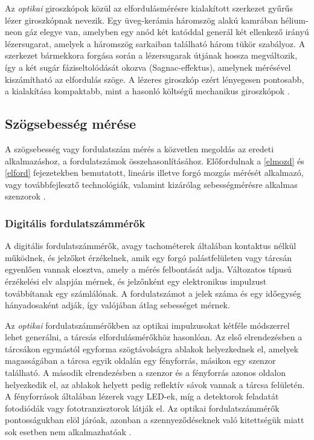 Az \textit{optikai} giroszkópok közül az elfordulásmérésre kialakított szerkezet gyűrűs lézer giroszkópnak nevezik. Egy üveg-kerámia háromszög alakú kamrában hélium-neon gáz elegye van, amelyben egy anód két katóddal generál két ellenkező irányú lézersugarat, amelyek a háromszög sarkaiban található három tükör szabályoz. A szerkezet bármekkora forgása során a lézersugarak útjának hossza megváltozik, így a két sugár fáziseltolódását okozva (Sagnac-effektus), amelynek mérésével kiszámítható az elfordulás szöge. A lézeres giroszkóp ezért lényegesen pontosabb, a kialakítása kompaktabb, mint a hasonló költségű mechanikus giroszkópok \cite{Morris2016b}.

\subsection{Szögsebesség mérése}

A szögsebesség vagy fordulatszám mérés a közvetlen megoldás az eredeti alkalmazáshoz, a fordulatszámok összehasonlításához. Előfordulnak a \ref{elmozd} és \ref{elford} fejezetekben bemutatott, lineáris illetve forgó mozgás mérését alkalmazó, vagy továbbfejlesztő technológiák, valamint kizárólag sebességmérésre alkalmas szenzorok \cite{Morris2016b}.

\subsubsection{Digitális fordulatszámmérők}

A digitális fordulatszámmérők, avagy tachométerek általában kontaktus nélkül működnek, és jelzőket érzékelnek, amik egy forgó palástfelületen vagy tárcsán egyenlően vannak elosztva, amely a mérés felbontását adja. Változatos típusú érzékelési elv alapján mérnek, és jelzőnként egy elektronikus impulzust továbbítanak egy számlálónak. A fordulatszámot a jelek száma és egy időegység hányadosaként adják, így valójában átlag sebességet mérnek. 

Az \textit{optikai} fordulatszámmérőkben az optikai impulzusokat kétféle módszerrel lehet generálni, a tárcsás elfordulásmérőkhöz hasonlóan. Az első elrendezésben a tárcsákon egymástól egyforma szögtávolságra ablakok helyezkednek el, amelyek magasságában a tárcsa egyik oldalán egy fényforrás, másikon egy szenzor található. A második elrendezésben a szenzor és a fényforrás azonos oldalon helyezkedik el, az ablakok helyett pedig reflektív sávok vannak a tárcsa felületén. A fényforrások általában lézerek vagy LED-ek, míg a detektorok feladatát fotodiódák vagy fototranzisztorok látják el. Az optikai fordulatszámmérők pontosságukban elöl járóak, azonban a szennyeződéseknek való kitettségük miatt sok esetben nem alkalmazhatóak \cite{Morris2016b}.


